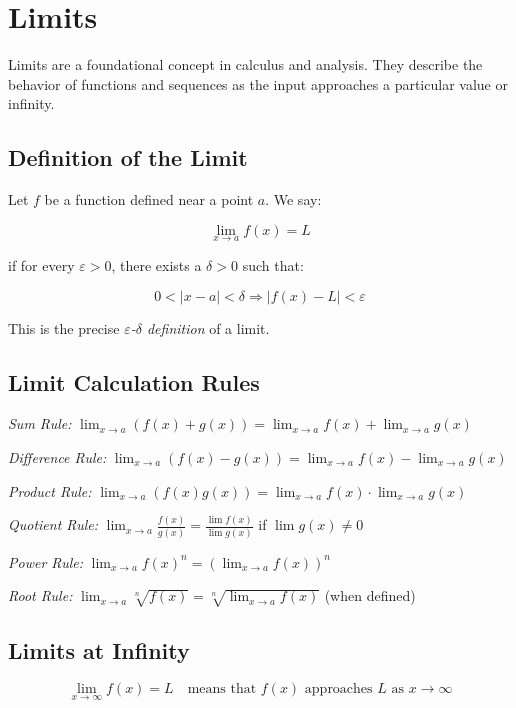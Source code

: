 \newpage
\section{Limits}

Limits are a foundational concept in calculus and analysis. They describe the behavior of 
functions and sequences as the input approaches a particular value or infinity.

\subsection{Definition of the Limit}

Let \(f\) be a function defined near a point \(a\). We say:

\[
    \lim_{x \to a} f(x) = L
\]

if for every \(\varepsilon > 0\), there exists a \(\delta > 0\) such that:

\[
    0 < |x - a| < \delta \Rightarrow |f(x) - L| < \varepsilon
\]

This is the precise \emph{\(\varepsilon\)-\(\delta\) definition} of a limit.

\subsection{Limit Calculation Rules}

\emph{Sum Rule:} \(\displaystyle \lim_{x \to a} (f(x) + g(x)) = \lim_{x \to a} f(x) + \lim_{x \to a} g(x)\)

\emph{Difference Rule:} \(\displaystyle \lim_{x \to a} (f(x) - g(x)) = \lim_{x \to a} f(x) - \lim_{x \to a} g(x)\)

\emph{Product Rule:} \(\displaystyle \lim_{x \to a} (f(x)g(x)) = \lim_{x \to a} f(x) \cdot \lim_{x \to a} g(x)\)

\emph{Quotient Rule:} \(\displaystyle \lim_{x \to a} \frac{f(x)}{g(x)} = \frac{\lim f(x)}{\lim g(x)}\) if \(\lim g(x) \ne 0\)

\emph{Power Rule:} \(\displaystyle \lim_{x \to a} {f(x)}^n = {(\lim_{x \to a} f(x))}^n\)

\emph{Root Rule:} \(\displaystyle \lim_{x \to a} \sqrt[n]{f(x)} = \sqrt[n]{\lim_{x \to a} f(x)}\) (when defined)

\subsection{Limits at Infinity}

\[
    \lim_{x \to \infty} f(x) = L \quad \text{means that } f(x) \text{ approaches } L \text{ as } x \to \infty
\]

